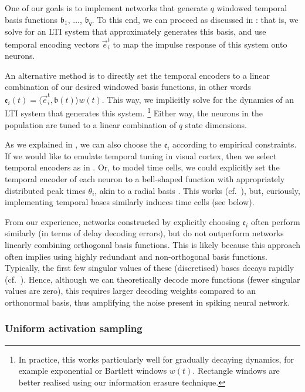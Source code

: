 One of our goals is to implement networks that generate $q$ windowed temporal basis functions $\mathfrak{b}_1$, $\ldots$, $\mathfrak{b}_q$.
To this end, we can proceed as discussed in : that is, we solve for an LTI system that approximately generates this basis, and use temporal encoding vectors $\vec{e}^t_i$ to map the impulse response of this system onto neurons.

An alternative method is to directly set the temporal encoders to a linear combination of our desired windowed basis functions, in other words $\mathfrak{e}_i(t) = \langle \vec{e}^\mathrm{t}_i, \mathfrak{b}(t) \rangle  w(t)$.
This way, we implicitly solve for the dynamics of an LTI system that generates this system.%
\footnote{In practice, this works particularly well for gradually decaying dynamics, for example exponential or Bartlett windows $w(t)$. Rectangle windows are better realised using our information erasure technique.}
Either way, the neurons in the population are tuned to a linear combination of $q$ state dimensions.

As we explained in , we can also choose the $\mathfrak{e}_i$ according to empirical constraints.
If we would like to emulate temporal tuning in visual cortex, then we select temporal encoders as in .
Or, to model time cells, we could explicitly set the temporal encoder of each neuron to a bell-shaped function with appropriately distributed peak times $\theta_i$, akin to a radial basis \citep{broomhead1988radial,stockel2020assorted}.
This works (cf.~), but, curiously, implementing temporal bases similarly induces time cells (see below).

From our experience, networks constructed by explicitly choosing $\mathfrak{e}_i$ often perform similarly (in terms of delay decoding errors), but do not outperform networks linearly combining orthogonal basis functions.
This is likely because this approach often implies using highly redundant and non-orthogonal basis functions.
Typically, the first few singular values of these (discretised) bases decays rapidly (cf.~).
Hence, although we can theoretically decode more functions (fewer singular values are zero), this requires larger decoding weights compared to an orthonormal basis, thus amplifying the noise present in spiking neural network.


\subsubsection{Uniform activation sampling}

